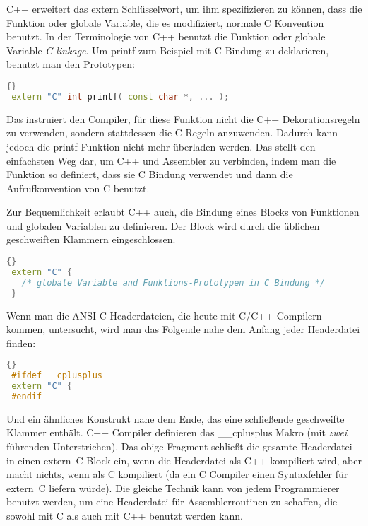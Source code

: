  C++ erweitert das {\code extern}
Schl\"{u}sselwort, um ihm spezifizieren zu k\"{o}nnen, dass die Funktion
oder globale Variable, die es modifiziert, normale C Konvention
benutzt. In der Terminologie von C++ benutzt die Funktion oder
globale Variable \emph{C linkage}. Um {\code printf} zum Beispiel
mit C Bindung zu deklarieren, benutzt man den Prototypen:
\begin{lstlisting}[language=C++, stepnumber=0]{}
 extern "C" int printf( const char *, ... );
\end{lstlisting}
\noindent Das instruiert den Compiler, f\"{u}r diese Funktion nicht die
C++ Dekorationsregeln zu verwenden, sondern stattdessen die C Regeln
anzuwenden. Dadurch kann jedoch die {\code printf}
 Funktion nicht mehr \"{u}berladen werden. Das stellt
den einfachsten Weg dar, um C++ und Assembler zu verbinden, indem
man die Funktion so definiert, dass sie C Bindung verwendet und dann
die Aufrufkonvention von C benutzt.

Zur Bequemlichkeit erlaubt C++ auch, die Bindung eines Blocks von
Funktionen und globalen Variablen zu definieren. Der Block wird
durch die \"{u}blichen geschweiften Klammern eingeschlossen.
\begin{lstlisting}[stepnumber=0, language=C++]{}
 extern "C" {
   /* globale Variable and Funktions-Prototypen in C Bindung */
 }
\end{lstlisting}

Wenn man die ANSI C Headerdateien, die heute mit C/C++ Compilern
kommen, untersucht, wird man das Folgende nahe dem Anfang jeder
Headerdatei finden:
\begin{lstlisting}[stepnumber=0, language=C++]{}
 #ifdef __cplusplus
 extern "C" {
 #endif
\end{lstlisting}
\noindent Und ein \"{a}hnliches Konstrukt nahe dem Ende, das eine
schlie{\ss}ende geschweifte Klammer enth\"{a}lt. C++ Compiler definieren das
{\code \_\_cplusplus} Makro (mit \emph{zwei} f\"{u}hrenden
Unterstrichen). Das obige Fragment schlie{\ss}t die gesamte Headerdatei
in einen {\code extern~\dq{}C\dq} Block ein, wenn die Headerdatei
als C++ kompiliert wird, aber macht nichts, wenn als C kompiliert
(da ein C Compiler einen Syntaxfehler f\"{u}r {\code extern~\dq{}C\dq}
liefern w\"{u}rde). Die gleiche Technik kann von jedem Programmierer
benutzt werden, um eine Headerdatei f\"{u}r Assemblerroutinen zu
schaffen, die sowohl mit C als auch mit C++ benutzt werden kann.
 


